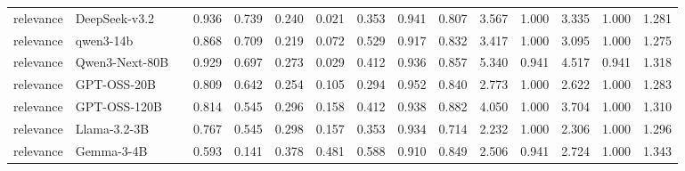 \begin{table}[t]
{\begin{tabular}{llrrrrrrrrrrrrr}
relevance & DeepSeek-v3.2 &  & 0.936 & 0.739 & 0.240 & 0.021 & 0.353 & 0.941 & 0.807 & 3.567 & 1.000 & 3.335 & 1.000 & 1.281 \\
relevance & qwen3-14b &  & 0.868 & 0.709 & 0.219 & 0.072 & 0.529 & 0.917 & 0.832 & 3.417 & 1.000 & 3.095 & 1.000 & 1.275 \\
relevance & Qwen3-Next-80B &  & 0.929 & 0.697 & 0.273 & 0.029 & 0.412 & 0.936 & 0.857 & 5.340 & 0.941 & 4.517 & 0.941 & 1.318 \\
relevance & GPT-OSS-20B &  & 0.809 & 0.642 & 0.254 & 0.105 & 0.294 & 0.952 & 0.840 & 2.773 & 1.000 & 2.622 & 1.000 & 1.283 \\
relevance & GPT-OSS-120B &  & 0.814 & 0.545 & 0.296 & 0.158 & 0.412 & 0.938 & 0.882 & 4.050 & 1.000 & 3.704 & 1.000 & 1.310 \\
relevance & Llama-3.2-3B &  & 0.767 & 0.545 & 0.298 & 0.157 & 0.353 & 0.934 & 0.714 & 2.232 & 1.000 & 2.306 & 1.000 & 1.296 \\
relevance & Gemma-3-4B &  & 0.593 & 0.141 & 0.378 & 0.481 & 0.588 & 0.910 & 0.849 & 2.506 & 0.941 & 2.724 & 1.000 & 1.343 \\
\bottomrule
\end{tabular}
}
\end{table}